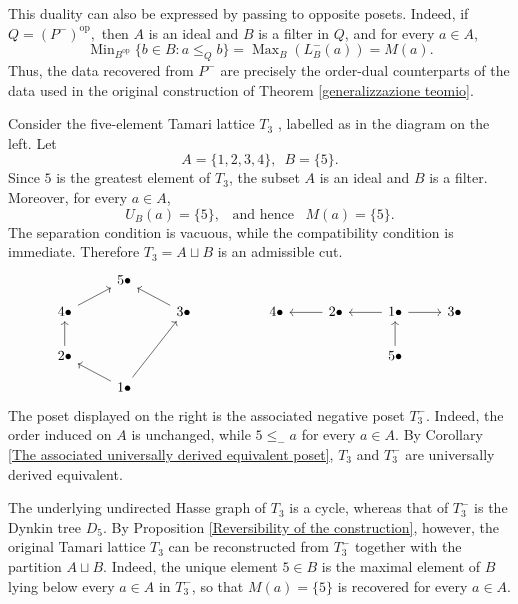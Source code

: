 This duality can also be expressed by passing to opposite posets. Indeed, if $Q=(P^-)^{\operatorname{op}},$ then $A$ is an ideal and $B$ is a filter in $Q$, and for every $a \in A$, 
\[\operatorname{Min}_{B^{\operatorname{op}}}\{b \in B \colon a \leq_Qb\}= \operatorname{Max}_B(L^-_B(a))=M(a).\]
Thus, the data recovered from $P^-$ are precisely the order-dual counterparts of the data used in the original construction of Theorem \ref{generalizzazione teomio}.

\begin{example} \label{T3/D5}
    Consider the five-element Tamari lattice $T_3$ \cite{Geyer}, labelled as in the diagram on the left. Let 
    \[A=\{1,2,3,4\}, \,\,\, B=\{5\}.\]
    Since $5$ is the greatest element of $T_3$, the subset $A$ is an ideal and $B$ is a filter. Moreover, for every $a \in A$,
    \[U_B(a)=\{5\}, \,\,\, \text{ and hence }\,\,\, M(a)=\{5\}.\]
    The separation condition is vacuous, while the compatibility condition is immediate. Therefore $T_3=A \sqcup B$ is an admissible cut.
\[\begin{tikzcd}[sep=small]
	&& {5 \bullet} &&&&&&&&&&&& \\
	{4 \bullet} &&&& {3 \bullet} &&&& {4 \bullet} && {2\bullet} && {1 \bullet} && {3 \bullet} \\
	\\
	{2 \bullet} &&&&&&&&&&&& {5 \bullet} \\
	&& {1 \bullet}
	\arrow[from=2-1, to=1-3]
	\arrow[from=2-5, to=1-3]
	\arrow[from=2-11, to=2-9]
	\arrow[from=2-13, to=2-11]
	\arrow[from=2-13, to=2-15]
	\arrow[from=4-1, to=2-1]
	\arrow[from=4-13, to=2-13]
	\arrow[from=5-3, to=2-5]
	\arrow[from=5-3, to=4-1]
\end{tikzcd}\]
The poset displayed on the right is the associated negative poset $T_3^-$. Indeed, the order induced on $A$ is unchanged, while $5 \leq_-a$ for every $a \in A$. By Corollary  \ref{The associated universally derived equivalent poset}, $T_3$ and $T_3^-$ are universally derived equivalent.

The underlying undirected Hasse graph of $T_3$ is a cycle, whereas that of $T_3^-$ is the Dynkin tree $D_5$. By Proposition \ref{Reversibility of the construction}, however, the original Tamari lattice $T_3$ can be reconstructed from $T_3^-$ together with the partition $A \sqcup B$. Indeed, the unique element $5 \in B$ is the maximal element of $B$ lying below every $a \in A$ in $T_3^-$, so that $M(a)=\{5\}$ is recovered for every $ a \in A$.
\end{example}

